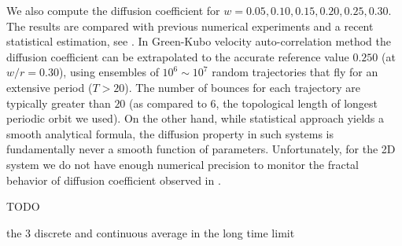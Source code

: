 We also compute the diffusion coefficient for $w = 0.05, 0.10, 0.15,
0.20, 0.25, 0.30$. The results are compared with previous numerical
experiments and a recent statistical estimation, see
. In Green-Kubo velocity auto-correlation method
the  diffusion coefficient can be extrapolated to the accurate
reference value $0.250$ (at $w/r=0.30$), using ensembles of
$10^6\sim10^7$ random trajectories that fly for an extensive period
($T > 20$). The number of bounces for each trajectory are
typically greater than $20$ (as compared to 6, the topological length
of longest periodic orbit we used). On the other hand, while
statistical approach yields a smooth analytical formula,
the diffusion property in such systems is fundamentally never a 
smooth function of parameters. Unfortunately, for 
the 2D system we do not have enough numerical precision to monitor 
the fractal behavior of diffusion coefficient observed in 
. 

TODO

the 3 discrete and continuous average in the long time limit
